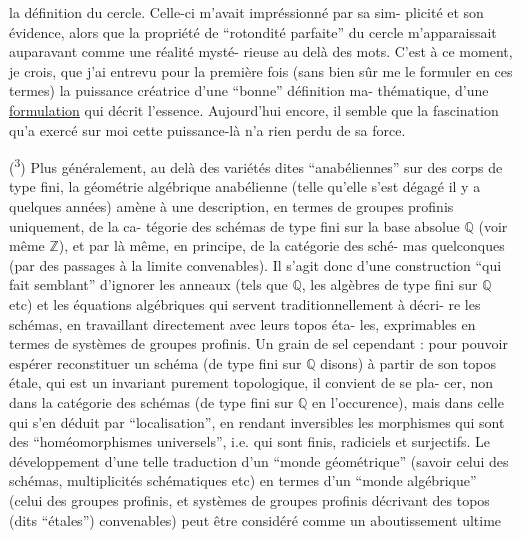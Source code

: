 
la définition du cercle. Celle-ci m'avait impréssionné par sa sim-%
plicité et son évidence, alors que la propriété de ``rotondité
parfaite'' du cercle m'apparaissait auparavant comme une réalité mysté-%
rieuse au delà des mots. C'est à ce moment, je crois, que j'ai
entrevu pour la première fois (sans bien sûr me le formuler en
ces termes) la puissance créatrice d'une ``bonne'' définition ma-%
thématique, d'une \uline{formulation} qui décrit l'essence. Aujourd'hui
encore, il semble que la fascination qu'a exercé sur moi cette
puissance-là n'a rien perdu de sa force.

(\textsuperscript{3}) Plus généralement, au delà des variétés dites ``anabéliennes''
sur des corps de type fini, la géométrie algébrique anabélienne
\margin{/}(telle qu'elle s'est dégagé il y a quelques années) amène à une
description, en termes de groupes profinis uniquement, de la ca-%
tégorie des schémas de type fini sur la base absolue $\mathbb{Q}$ (voir
même $\mathbb{Z}$), et par là même, en principe, de la catégorie des sché-%
mas quelconques (par des passages à la limite convenables). Il
s'agit donc d'une construction ``qui fait semblant'' d'ignorer les
anneaux (tels que $\mathbb{Q}$, les algèbres de type fini sur $\mathbb{Q}$ etc) et
les équations algébriques qui servent traditionnellement à décri-%
re les schémas, en travaillant directement avec leurs topos éta-%
les, exprimables en termes de systèmes de groupes profinis. Un
grain de sel cependant : pour pouvoir espérer reconstituer un
schéma (de type fini sur $\mathbb{Q}$ disons) à partir de son topos étale,
qui est un invariant purement topologique, il convient de se pla-%
cer, non dans la catégorie des schémas (de type fini sur $\mathbb{Q}$ en
l'occurence), mais dans celle qui s'en déduit par ``localisation'',
en rendant inversibles les morphismes qui sont des ``homéomorphismes
universels'', i.e. qui sont finis, radiciels et surjectifs. Le
développement d'une telle traduction d'un ``monde géométrique''
(savoir celui des schémas, multiplicités schématiques etc) en
termes d'un ``monde algébrique'' (celui des groupes profinis, et
systèmes de groupes profinis décrivant des topos (dits ``étales'')
convenables) peut être considéré comme un aboutissement ultime


